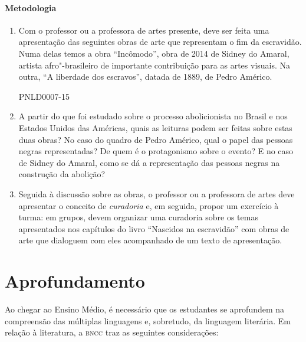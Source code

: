 \documentclass[11pt]{extarticle}
\begin{document}
\begin{enumerate}
\begin{enumerate}
\begin{enumerate}
\paragraph{Metodologia} 

\begin{enumerate}
  \item 
  Com o professor ou a professora de artes presente, deve ser feita uma apresentação
  das seguintes obras de arte que representam o fim da escravidão. 
  Numa delas temos a obra ``Incômodo'', obra de 2014 de Sidney do Amaral, artista afro"-brasileiro
  de importante contribuição para as artes visuais. Na outra, ``A liberdade dos escravos'', datada de
  1889, de Pedro Américo.

  {PNLD0007-15}

  \item
  A partir do que foi estudado sobre o processo abolicionista no Brasil e 
  nos Estados Unidos das
  Américas, quais as leituras podem ser feitas sobre estas duas obras?
  No caso do quadro de Pedro Américo, qual o papel das pessoas negras
  representadas? De quem é o protagonismo sobre o evento? 
  E no caso de Sidney do Amaral, como se dá a representação
  das pessoas negras na construção da abolição?

  \item
  Seguida à discussão sobre as obras, o professor ou a professora de 
  artes deve apresentar o conceito de \textit{curadoria} e, em seguida,
  propor um exercício à turma: em grupos, devem organizar uma 
  curadoria sobre os temas apresentados nos capítulos do livro ``Nascidos
  na escravidão'' com obras de arte que dialoguem com eles 
  acompanhado de um texto de apresentação. 

\end{enumerate}


\section{Aprofundamento}

Ao chegar ao Ensino Médio, é necessário que os estudantes se aprofundem
na compreensão das múltiplas linguagens e, sobretudo, da linguagem
literária. Em relação à literatura, a \textsc{bncc} traz as seguintes
considerações:


\end{enumerate}
\end{enumerate}
\end{enumerate}
\end{document}
